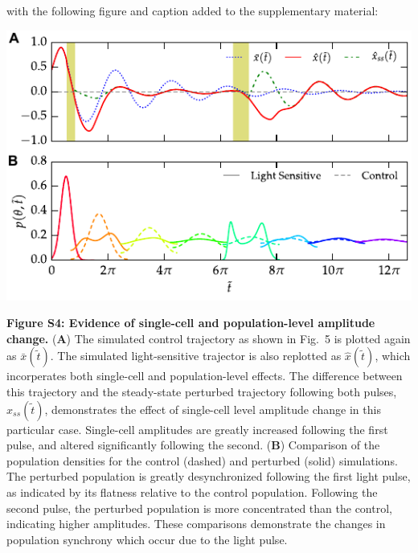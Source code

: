 \documentclass[11pt, letterpaper]{article}
\newenvironment{manuscript}[1]{\begin{center}\begin{tcolorbox}[colback=green!5!white,colframe=green!75!black,width=0.8\textwidth,title={#1},breakable,fonttitle=\bfseries]}{\end{tcolorbox}\end{center}}
\begin{document}
with the following figure and caption added to the supplementary material:

\begin{manuscript}{Supplemental Info, Page 7}
  \begin{center}
    \includegraphics[width=.85\textwidth]{figures/figure_S4.pdf}\\
  \end{center}
{\bfseries Figure S4: Evidence of single-cell and population-level amplitude change.}
({\bfseries A}) The simulated control trajectory as shown in Fig.~5 is plotted again as $\bar{x}(\tilde{t})$.
The simulated light-sensitive trajector is also replotted as $\hat{x}(\tilde{t})$, which incorperates both single-cell and population-level effects.
The difference between this trajectory and the steady-state perturbed trajectory following both pulses, $\hat{x}_{ss}(\tilde{t})$, demonstrates the effect of single-cell level amplitude change in this particular case. 
Single-cell amplitudes are greatly increased following the first pulse, and altered significantly following the second.
({\bfseries B})
Comparison of the population densities for the control (dashed) and perturbed (solid) simulations.
The perturbed population is greatly desynchronized following the first light pulse, as indicated by its flatness relative to the control population. 
Following the second pulse, the perturbed population is more concentrated than the control, indicating higher amplitudes. 
These comparisons demonstrate the changes in population synchrony which occur due to the light pulse. 
\end{manuscript}
\end{document}
